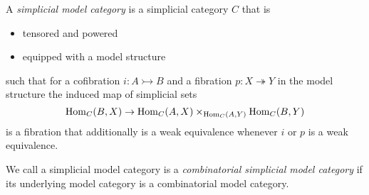 \begin{definition}
    A \emph{simplicial model category} is a simplicial category $C$ that is 
    \begin{itemize}
        \item tensored and powered
        \item equipped with a model structure
    \end{itemize} 
    such that for a cofibration $i:A\rightarrowtail B$ and a fibration $p:X\twoheadrightarrow Y$ in the model structure the induced map of simplicial sets
    \begin{equation*}
        \operatorname{Hom}_C(B,X)\to\operatorname{Hom}_C(A,X)\times_{\operatorname{Hom}_C(A,Y)}\operatorname{Hom}_C(B,Y)
    \end{equation*}
    is a fibration that additionally is a weak equivalence whenever $i$ or $p$ is a weak equivalence.
    
    We call a simplicial model category is a \emph{combinatorial simplicial model category} if its underlying model category is a combinatorial model category.
\end{definition}
